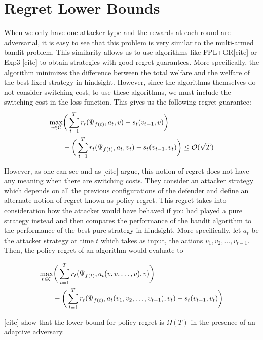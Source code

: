 \section{Regret Lower Bounds}\label{sec:lower-bounds}
When we only have one attacker type and the rewards at each round are adversarial, it is easy to see that this problem is very similar to the multi-armed bandit problem. This similarity allows us to use algorithms like FPL+GR[cite] or Exp3 [cite] to obtain strategies with good regret guarantees. More specifically, the algorithm minimizes the difference between the total welfare and the welfare of the best fixed strategy in hindsight. However, since the algorithms themselves do not consider switching cost, to use these algorithms, we must include the switching cost in the loss function. This gives us the following regret guarantee:
\begin{align*}
    \max_{v \in \cal C} & \bigg (\sum_{t=1}^T r_t(\Psi_{f(t)}, a_t, v) - s_t(v_{t-1}, v) \bigg ) \\
    & - \bigg ( \sum_{t=1}^T r_t(\Psi_{f(t)}, a_t, v_t) - s_t(v_{t-1}, v_t) \bigg ) 
    \le \cal O(\sqrt{T})
\end{align*}

However, as one can see and as [cite] argue, this notion of regret does not have any meaning when there are switching costs. They consider an attacker strategy which depends on all the previous configurations of the defender and define an alternate notion of regret known as policy regret. This regret takes into consideration how the attacker would have behaved if you had played a pure strategy instead and then compares the performance of the bandit algorithm to the performance of the best pure strategy in hindsight. More specifically, let $a_t$ be the attacker strategy at time $t$ which takes as input, the actions $v_1, v_2, \dots, v_{t-1}$. Then, the policy regret of an algorithm would evaluate to

\begin{align*}
    \max_{v \in \cal C} & \bigg (\sum_{t=1}^T r_t(\Psi_{f(t)}, a_t(v, v, \dots, v), v) \bigg ) \\
    & - \bigg ( \sum_{t=1}^T r_t(\Psi_{f(t)}, a_t(v_1, v_2, \dots, v_{t-1}), v_t) - s_t(v_{t-1}, v_t) \bigg ) 
\end{align*}

[cite] show that the lower bound for policy regret is $\Omega (T)$ in the presence of an adaptive adversary. 

